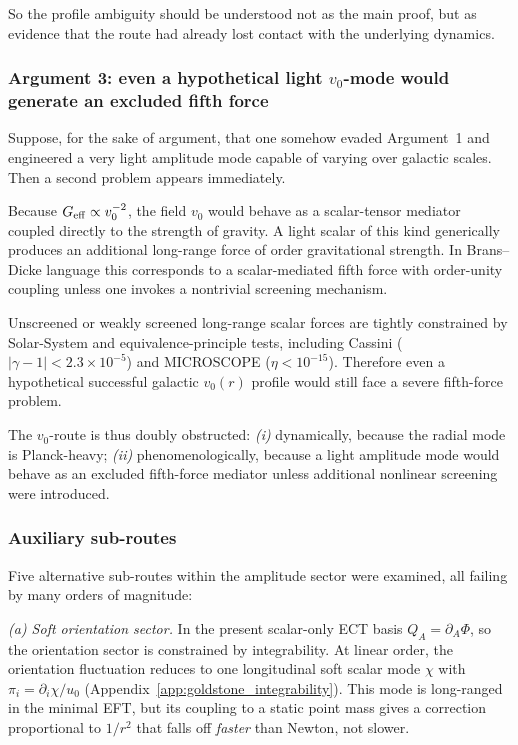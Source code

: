 \documentclass[11pt,a4paper]{article}
\numberwithin{equation}{section}
\begin{document}
So the profile ambiguity should be understood not as the main
proof, but as evidence that the route had already lost contact
with the underlying dynamics.

\subsubsection{Argument 3: even a hypothetical light
$v_0$-mode would generate an excluded fifth force}

Suppose, for the sake of argument, that one somehow evaded
Argument~1 and engineered a very light amplitude mode capable
of varying over galactic scales.
Then a second problem appears immediately.

Because $G_{\rm eff} \propto v_0^{-2}$, the field $v_0$ would
behave as a scalar-tensor mediator coupled directly to the
strength of gravity.
A light scalar of this kind generically produces an additional
long-range force of order gravitational strength.
In Brans--Dicke language this corresponds to a scalar-mediated
fifth force with order-unity coupling unless one invokes a
nontrivial screening mechanism.

Unscreened or weakly screened long-range scalar forces are
tightly constrained by Solar-System and equivalence-principle
tests, including Cassini ($|\gamma-1| < 2.3\times10^{-5}$)
and MICROSCOPE ($\eta < 10^{-15}$).
Therefore even a hypothetical successful galactic $v_0(r)$
profile would still face a severe fifth-force problem.

The $v_0$-route is thus doubly obstructed:
\emph{(i)} dynamically, because the radial mode is
Planck-heavy;
\emph{(ii)} phenomenologically, because a light amplitude
mode would behave as an excluded fifth-force mediator unless
additional nonlinear screening were introduced.

\subsubsection{Auxiliary sub-routes}

Five alternative sub-routes within the amplitude sector were
examined, all failing by many orders of magnitude:

\emph{(a) Soft orientation sector.}
In the present scalar-only ECT basis $Q_A=\partial_A\Phi$,
so the orientation sector is constrained by integrability.
At linear order, the orientation fluctuation reduces to one
longitudinal soft scalar mode $\chi$ with $\pi_i=\partial_i\chi/u_0$
(Appendix~\ref{app:goldstone_integrability}).
This mode is long-ranged in the minimal EFT, but its coupling to a
static point mass gives a correction proportional to $1/r^2$ that falls off
\emph{faster} than Newton, not slower.
\end{document}
